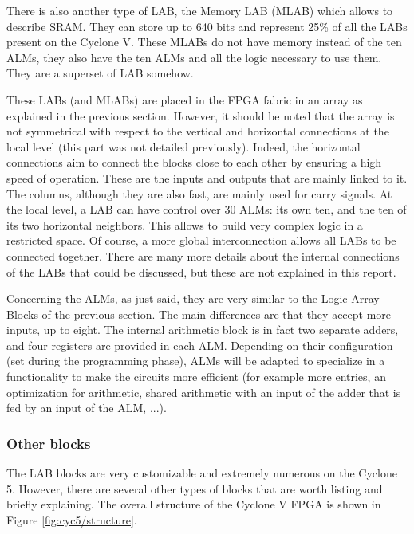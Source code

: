 There is also another type of LAB, the Memory LAB (MLAB) which allows to describe SRAM. They can 
store up to 640 bits and represent 25\% of all the LABs present on the Cyclone V. These MLABs do not 
have memory instead of
the ten ALMs, they also have the ten ALMs and all the logic necessary 
to use them. They are a superset of LAB somehow.

These LABs (and MLABs) are placed in the FPGA fabric in an array as explained in the previous 
section. However, it should be noted that the array is not symmetrical with respect 
to the vertical and horizontal connections at the local level (this part was not detailed 
previously). Indeed, the horizontal connections aim to connect the blocks close to each other by 
ensuring a high speed of operation. These are the inputs and outputs that are mainly linked to it. 
The columns, although they are also fast, are mainly used for carry signals. At the local level, a 
LAB can have control over 30 ALMs: its own ten, and the ten of its two horizontal neighbors. This
allows to build very complex logic in a restricted space. Of course, a more global interconnection 
allows all LABs to be connected together. There are many more details about the internal 
connections of the LABs that could be discussed, but these are not explained in this report.

Concerning the ALMs, as just said, they are very similar to the Logic Array Blocks of 
the previous section. The main differences are that they accept more inputs, up to eight. The 
internal arithmetic block is in fact two separate adders, and four registers are provided in each ALM. 
Depending on their configuration (set during the programming phase), ALMs will be adapted to 
specialize in a functionality to make the circuits more efficient (for example more entries, an 
optimization for arithmetic, shared arithmetic with an input of the adder that is fed by an input 
of the ALM, ...). 

\subsubsection*{Other blocks}

The LAB blocks are very customizable and extremely numerous on the Cyclone 5. However, there are 
several other types of blocks that are worth listing and briefly explaining. The overall structure 
of the Cyclone V FPGA is shown in Figure \ref{fig:cyc5/structure}.

